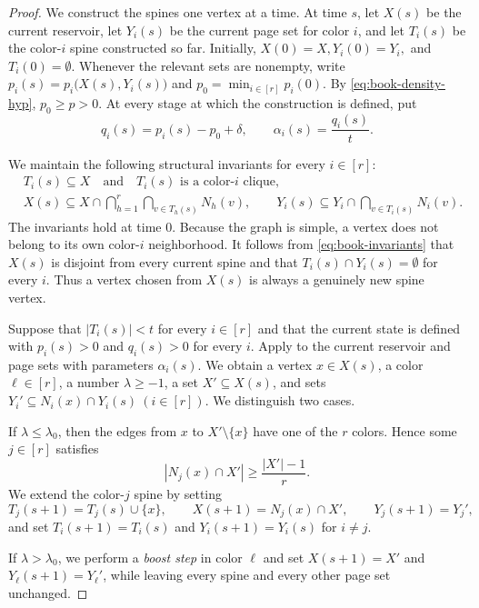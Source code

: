 \documentclass[twoside,12pt]{article}
\theoremstyle{definition}
\theoremstyle{remark}
\newcommand{\1}{\mathbf 1}
\begin{document}
\begin{proof}
We construct the spines one vertex at a time. At time $s$, let $X(s)$ be the
current reservoir, let $Y_i(s)$ be the current page set for color $i$, and
let $T_i(s)$ be the color-$i$ spine constructed so far. Initially,
$
 X(0)=X,
 Y_i(0)=Y_i,$ and $
 T_i(0)=\emptyset.
$
Whenever the relevant sets are nonempty, write
$p_i(s)=p_i\bigl(X(s),Y_i(s)\bigr)$ and $ p_0=\min_{i\in[r]}p_i(0).
$
By \eqref{eq:book-density-hyp}, $p_0\ge p>0$. At every stage at which the
construction is defined, put
\begin{equation}\label{eq:q-alpha}
 q_i(s)=p_i(s)-p_0+\delta,
 \qquad
 \alpha_i(s)=\frac{q_i(s)}{t}.
\end{equation}

We maintain the following structural invariants for every $i\in[r]$:
\begin{equation}\label{eq:book-invariants}
 \begin{aligned}
 &T_i(s)\subseteq X
   \quad\text{and}\quad T_i(s)\text{ is a color-$i$ clique},\\
 &X(s)\subseteq X\cap
   \bigcap_{h=1}^r\bigcap_{v\in T_h(s)}N_h(v),\qquad Y_i(s)\subseteq Y_i\cap\bigcap_{v\in T_i(s)}N_i(v).
 \end{aligned}
\end{equation}
The invariants hold at time $0$. Because the graph is simple, a vertex does
not belong to its own color-$i$ neighborhood. It follows from
\eqref{eq:book-invariants} that $X(s)$ is disjoint from every current spine
and that $T_i(s)\cap Y_i(s)=\emptyset$ for every $i$. Thus a vertex chosen
from $X(s)$ is always a genuinely new spine vertex.

Suppose that $|T_i(s)|<t$ for every $i\in[r]$ and that the current state is
defined with $p_i(s)>0$ and $q_i(s)>0$ for every $i$. Apply
 to the current reservoir and page sets with parameters
$\alpha_i(s)$. We obtain a vertex $x\in X(s)$, a color $\ell\in[r]$, a
number $\lambda\ge-1$, a set $X'\subseteq X(s)$, and sets
$
 Y_i'\subseteq N_i(x)\cap Y_i(s)
~(i\in[r]).
$
We distinguish two cases.

If $\lambda\le\lambda_0$, then the edges from $x$ to
$X'\setminus\{x\}$ have one of the $r$ colors. Hence some $j\in[r]$
satisfies
\[
 |N_j(x)\cap X'|\ge\frac{|X'|-1}{r}.
\]
We extend the color-$j$ spine by setting
\[
 T_j(s+1)=T_j(s)\cup\{x\},
 \qquad
 X(s+1)=N_j(x)\cap X',
 \qquad
 Y_j(s+1)=Y_j',
\]
and set $T_i(s+1)=T_i(s)$ and $Y_i(s+1)=Y_i(s)$ for $i\ne j$.

If $\lambda>\lambda_0$, we perform a \emph{boost step} in color $\ell$ and
set
$
 X(s+1)=X'$
and $Y_\ell(s+1)=Y_\ell'$,
while leaving every spine and every other page set unchanged.


\end{proof}
\end{document}
